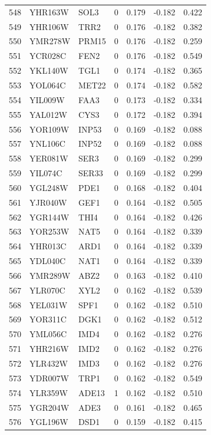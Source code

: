 \begin{longtable}{rllrrrr}
548 & YHR163W & SOL3 & 0 & 0.179 & -0.182 & 0.422\\
549 & YHR106W & TRR2 & 0 & 0.176 & -0.182 & 0.382\\
550 & YMR278W & PRM15 & 0 & 0.176 & -0.182 & 0.259\\
551 & YCR028C & FEN2 & 0 & 0.176 & -0.182 & 0.549\\
552 & YKL140W & TGL1 & 0 & 0.174 & -0.182 & 0.365\\
553 & YOL064C & MET22 & 0 & 0.174 & -0.182 & 0.582\\
554 & YIL009W & FAA3 & 0 & 0.173 & -0.182 & 0.334\\
555 & YAL012W & CYS3 & 0 & 0.172 & -0.182 & 0.394\\
556 & YOR109W & INP53 & 0 & 0.169 & -0.182 & 0.088\\
557 & YNL106C & INP52 & 0 & 0.169 & -0.182 & 0.088\\
558 & YER081W & SER3 & 0 & 0.169 & -0.182 & 0.299\\
559 & YIL074C & SER33 & 0 & 0.169 & -0.182 & 0.299\\
560 & YGL248W & PDE1 & 0 & 0.168 & -0.182 & 0.404\\
561 & YJR040W & GEF1 & 0 & 0.164 & -0.182 & 0.505\\
562 & YGR144W & THI4 & 0 & 0.164 & -0.182 & 0.426\\
563 & YOR253W & NAT5 & 0 & 0.164 & -0.182 & 0.339\\
564 & YHR013C & ARD1 & 0 & 0.164 & -0.182 & 0.339\\
565 & YDL040C & NAT1 & 0 & 0.164 & -0.182 & 0.339\\
566 & YMR289W & ABZ2 & 0 & 0.163 & -0.182 & 0.410\\
567 & YLR070C & XYL2 & 0 & 0.162 & -0.182 & 0.539\\
568 & YEL031W & SPF1 & 0 & 0.162 & -0.182 & 0.510\\
569 & YOR311C & DGK1 & 0 & 0.162 & -0.182 & 0.512\\
570 & YML056C & IMD4 & 0 & 0.162 & -0.182 & 0.276\\
571 & YHR216W & IMD2 & 0 & 0.162 & -0.182 & 0.276\\
572 & YLR432W & IMD3 & 0 & 0.162 & -0.182 & 0.276\\
573 & YDR007W & TRP1 & 0 & 0.162 & -0.182 & 0.549\\
574 & YLR359W & ADE13 & 1 & 0.162 & -0.182 & 0.510\\
575 & YGR204W & ADE3 & 0 & 0.161 & -0.182 & 0.465\\
576 & YGL196W & DSD1 & 0 & 0.159 & -0.182 & 0.415\\

\end{longtable}
